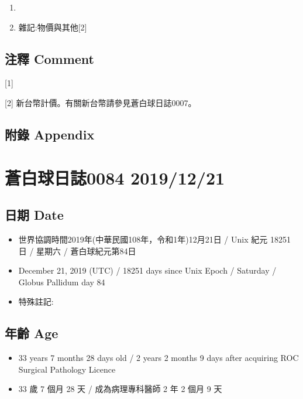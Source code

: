 \documentclass[
]{article}
\providecommand{\tightlist}{%
  \setlength{\itemsep}{0pt}\setlength{\parskip}{0pt}}
\begin{document}
\begin{enumerate}
\def\labelenumi{\arabic{enumi}.}
\item
\item
  雜記:物價與其他{[}2{]}
\end{enumerate}

\hypertarget{ux6ce8ux91cb-comment-18}{%
\subsection{注釋 Comment}\label{ux6ce8ux91cb-comment-18}}

{[}1{]}

{[}2{]} 新台幣計價。有關新台幣請參見蒼白球日誌0007。

\hypertarget{ux9644ux9304-appendix-19}{%
\subsection{附錄 Appendix}\label{ux9644ux9304-appendix-19}}

\hypertarget{ux84bcux767dux7403ux65e5ux8a8c0084-20191221}{%
\section{蒼白球日誌0084
2019/12/21}\label{ux84bcux767dux7403ux65e5ux8a8c0084-20191221}}

\hypertarget{ux65e5ux671f-date-20}{%
\subsection{日期 Date}\label{ux65e5ux671f-date-20}}

\begin{itemize}
\tightlist
\item
  世界協調時間2019年(中華民國108年，令和1年)12月21日 / Unix 紀元 18251
  日 / 星期六 / 蒼白球紀元第84日
\item
  December 21, 2019 (UTC) / 18251 days since Unix Epoch / Saturday /
  Globus Pallidum day 84
\item
  特殊註記:
\end{itemize}

\hypertarget{ux5e74ux9f61-age-20}{%
\subsection{年齡 Age}\label{ux5e74ux9f61-age-20}}

\begin{itemize}
\tightlist
\item
  33 years 7 months 28 days old / 2 years 2 months 9 days after
  acquiring ROC Surgical Pathology Licence
\item
  33 歲 7 個月 28 天 / 成為病理專科醫師 2 年 2 個月 9 天
\end{itemize}
\end{document}
